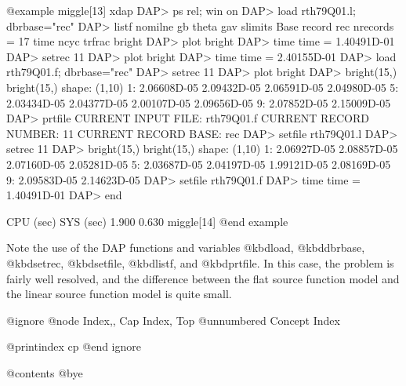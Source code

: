 @example
miggle[13] xdap
DAP> ps rel; win on
DAP> load rth79Q01.l; dbrbase="rec"
DAP> listf
nomilne  gb       theta    gav      slimits
Base record
rec                                             nrecords =    17
        time      ncyc     trfrac   bright
DAP> plot bright
DAP> time
time     =    1.40491D-01
DAP> setrec 11
DAP> plot bright
DAP> time
time     =    2.40155D-01
DAP> load rth79Q01.f; dbrbase="rec"
DAP> setrec 11
DAP> plot bright
DAP> bright(15,)
bright(15,)        shape: (1,10) 
  1:         2.06608D-05   2.09432D-05   2.06591D-05   2.04980D-05
  5:         2.03434D-05   2.04377D-05   2.00107D-05   2.09656D-05
  9:         2.07852D-05   2.15009D-05 
DAP> prtfile
CURRENT INPUT FILE:  rth79Q01.f 
CURRENT RECORD NUMBER:     11
CURRENT RECORD BASE:  rec                     
DAP> setfile rth79Q01.l
DAP> setrec 11
DAP> bright(15,)
bright(15,)        shape: (1,10) 
  1:         2.06927D-05   2.08857D-05   2.07160D-05   2.05281D-05
  5:         2.03687D-05   2.04197D-05   1.99121D-05   2.08169D-05
  9:         2.09583D-05   2.14623D-05 
DAP> setfile rth79Q01.f
DAP> time
time     =    1.40491D-01
DAP> end

   CPU (sec)    SYS (sec)
       1.900       0.630
miggle[14] 
@end example

Note the use of the DAP functions and variables @kbd{load}, @kbd{dbrbase},
@kbd{setrec}, @kbd{setfile}, @kbd{listf}, and @kbd{prtfile}.  In this case,
the problem is fairly well resolved, and the difference between the flat
source function model and the linear source function model is quite
small.

@ignore
@node Index,, Cap Index, Top
@unnumbered Concept Index

@printindex cp
@end ignore

@contents
@bye
